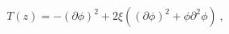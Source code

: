 \begin{equation}\label{2.18}
T(z)=-(\partial \phi)^2+2\xi((\partial \phi)^2+\phi \partial^2 \phi) ~,
\end{equation}

